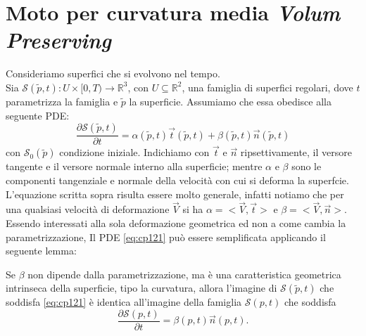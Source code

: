 \section{Moto per curvatura media \emph{Volum Preserving}}

Consideriamo superfici che si evolvono nel tempo. \\
Sia $\mathcal{S}(\tilde{p},t):U\times[0,T)\longrightarrow\mathbb{R}^3$, con $U\subseteq\mathbb{R}^2$, una famiglia di superfici regolari, dove $t$ parametrizza la famiglia e $\tilde{p}$ la superficie. Assumiamo che essa obedisce alla seguente PDE:
\begin{equation}
  \label{eq:cp121}
  \frac{\partial\mathcal{S}(\tilde{p},t)}{\partial t} = \alpha(\tilde{p},t)\vec{t}(\tilde{p},t) + \beta(\tilde{p},t)\vec{n}(\tilde{p},t)
\end{equation}
con $\mathcal{S}_0(\tilde{p})$ condizione iniziale. Indichiamo con $\vec{t}$ e $\vec{n}$ ripsettivamente, il versore tangente e il versore normale interno alla superficie; mentre $\alpha$ e $\beta$ sono le componenti tangenziale e normale della velocità con cui si deforma la superfcie. L'equazione scritta sopra risulta essere molto generale, infatti notiamo che per una qualsiasi velocità di deformazione $\vec{V}$ si ha $\alpha=<\vec{V},\vec{t}>$ e $\beta=<\vec{V},\vec{n}>$. Essendo interessati alla sola deformazione geometrica ed non a come cambia la parametrizzazione, Il PDE \eqref{eq:cp121} può essere semplificata applicando il seguente lemma:
\begin{lemma}
Se $\beta$ non dipende dalla parametrizzazione, ma è una caratteristica geometrica intrinseca della superficie, tipo la curvatura, allora l'imagine di $\mathcal{S}(\tilde{p},t)$ che soddisfa \eqref{eq:cp121} è identica all'imagine della famiglia $\mathcal{S}(p,t)$ che soddisfa
\begin{equation}
  \label{eq:cp122}
  \frac{\partial\mathcal{S}(p,t)}{\partial t} =\beta(p,t)\vec{n}(p,t).
\end{equation}
\end{lemma}


